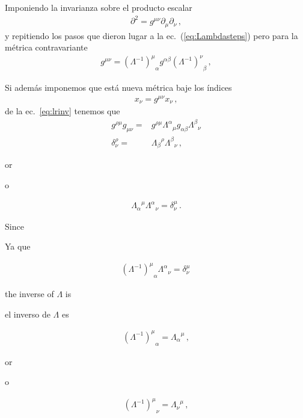 \begin{frame}
Imponiendo la invarianza sobre el producto escalar
\begin{align}
  \partial^2=g^{\mu\nu}\partial_{\mu} \partial_{\nu}\,,
\end{align}
y repitiendo los pasos que dieron lugar a la ec.~(\ref{eq:Lambdasteps})
pero para la métrica contravariante
\begin{align}
g^{\mu\nu}= {\left(\Lambda^{-1}\right)^\mu}_\alpha g^{\alpha \beta}{\left(\Lambda^{-1}\right)^\nu}_\beta\,, 
\end{align}

Si además imponemos que está nueva métrica baje los índices
\begin{align}
  x_{\nu}=g^{\mu\nu}x_{\nu}\,,
\end{align}
de la ec.~\eqref{eq:lrinv} tenemos que
\begin{align}
  g^{\rho\mu}g_{\mu\nu}=&g^{\rho\mu}{\Lambda^\alpha}_{\mu}g_{\alpha\beta}{\Lambda^\beta}_{\nu}\nonumber\\
  \delta^\rho_\nu=&{\Lambda_\beta}^\rho{\Lambda^\beta}_{\nu}\,,
\end{align}
\begin{english}
or  
\end{english}
\begin{spanish}
o
\end{spanish}
\begin{align}
  {\Lambda_\alpha}^\mu{\Lambda^\alpha}_{\nu}=\delta^\mu_\nu\,.
\end{align}
\begin{english}
Since
\end{english}
\begin{spanish}
Ya que
\end{spanish}
\begin{align}
  {\left(\Lambda^{-1}\right)^\mu}_\alpha{\Lambda^\alpha}_{\nu}=\delta^\mu_\nu\,
\end{align}
\begin{english}
the inverse of $\Lambda$ is
\end{english}
\begin{spanish}
el inverso de $\Lambda$ es
\end{spanish}
\begin{align}
  {\left(\Lambda^{-1}\right)^\mu}_\alpha={\Lambda_\alpha}^\mu\,,
\end{align}
\begin{english}
or  
\end{english}
\begin{spanish}
o
\end{spanish}
\begin{align}
\label{eq:lambdainv}
  {\left(\Lambda^{-1}\right)^\mu}_\nu={\Lambda_\nu}^\mu\,,
\end{align}


\end{frame}
